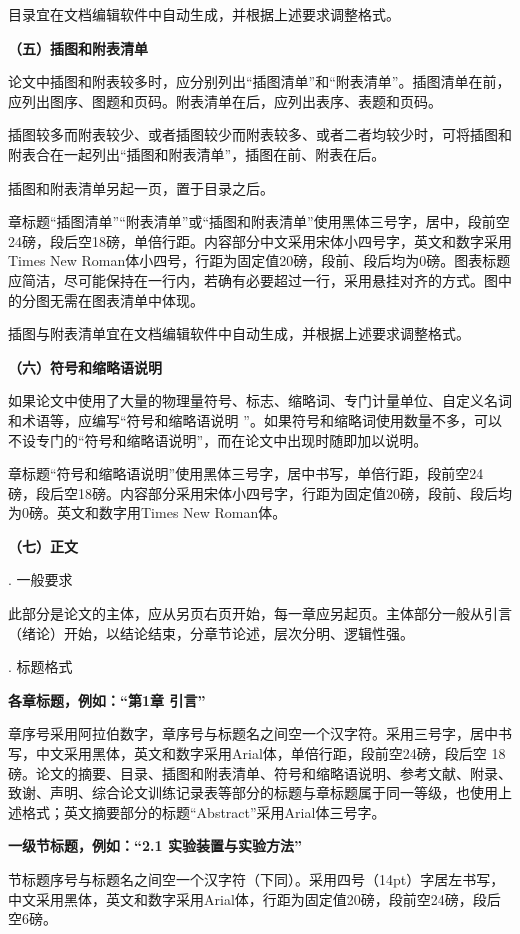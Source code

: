 \documentclass{Diploma}
\begin{document}
目录宜在文档编辑软件中自动生成，并根据上述要求调整格式。

\noindent\textbf{（五）插图和附表清单}

论文中插图和附表较多时，应分别列出“插图清单”和“附表清单”。插图清单在前，应列出图序、图题和页码。附表清单在后，应列出表序、表题和页码。

插图较多而附表较少、或者插图较少而附表较多、或者二者均较少时，可将插图和附表合在一起列出“插图和附表清单”，插图在前、附表在后。

插图和附表清单另起一页，置于目录之后。

章标题“插图清单”“附表清单”或“插图和附表清单”使用黑体三号字，居中，段前空24磅，段后空18磅，单倍行距。内容部分中文采用宋体小四号字，英文和数字采用Times New Roman体小四号，行距为固定值20磅，段前、段后均为0磅。图表标题应简洁，尽可能保持在一行内，若确有必要超过一行，采用悬挂对齐的方式。图中的分图无需在图表清单中体现。

插图与附表清单宜在文档编辑软件中自动生成，并根据上述要求调整格式。

\noindent\textbf{（六）符号和缩略语说明}

如果论文中使用了大量的物理量符号、标志、缩略词、专门计量单位、自定义名词和术语等，应编写“符号和缩略语说明 ”。如果符号和缩略词使用数量不多，可以不设专门的“符号和缩略语说明”，而在论文中出现时随即加以说明。

章标题“符号和缩略语说明”使用黑体三号字，居中书写，单倍行距，段前空24 磅，段后空18磅。内容部分采用宋体小四号字，行距为固定值20磅，段前、段后均为0磅。英文和数字用Times New Roman体。

\noindent\textbf{（七）正文}

. 一般要求

此部分是论文的主体，应从另页右页开始，每一章应另起页。主体部分一般从引言（绪论）开始，以结论结束，分章节论述，层次分明、逻辑性强。

. 标题格式

\textbf{各章标题，例如：“第1章 引言”}

章序号采用阿拉伯数字，章序号与标题名之间空一个汉字符。采用三号字，居中书写，中文采用黑体，英文和数字采用Arial体，单倍行距，段前空24磅，段后空 18 磅。论文的摘要、目录、插图和附表清单、符号和缩略语说明、参考文献、附录、致谢、声明、综合论文训练记录表等部分的标题与章标题属于同一等级，也使用上述格式；英文摘要部分的标题“Abstract”采用Arial体三号字。

\textbf{一级节标题，例如：“2.1 实验装置与实验方法”}

节标题序号与标题名之间空一个汉字符（下同）。采用四号（14pt）字居左书写，中文采用黑体，英文和数字采用Arial体，行距为固定值20磅，段前空24磅，段后空6磅。
\end{document}
